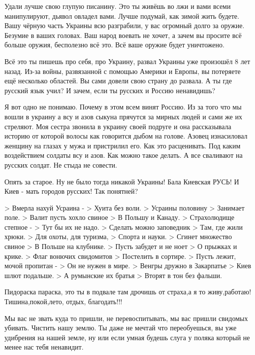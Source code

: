Удали лучше свою глупую писанину. Это ты живёшь во лжи и вами всеми
манипулируют, дьявол овладел вами. Лучше подумай, как зимой жить будете. Вашу
чёрную часть Украины всю разграбили, у вас огромный долго за оружие. Безумие в
ваших головах. Ваш народ воевать не хочет, а зачем вы просите всё больше
оружия, бесполезно всё это. Всё ваше оружие будет уничтожено.

Всё это ты пишешь про себя, про Украину, развал Украины уже произошёл 8 лет
назад. Из-за войны, развязанной с помощью Америки и Европы, вы потеряете ещё
несколько областей. Вы сами довели свою страну до развала. А ты где русский
язык учил? И зачем, если ты русских и Россию ненавидишь?

Я вот одно не понимаю. Почему в этом всем винят Россию. Из за того что мы вошли
в украину а всу и азов сыкуна прячутся за мирных людей и сами же их стреляют.
Моя сестра звонила в украину своей подруге и она рассказывала историю от
которой волосы как говорится дыбом на голове. Азовец изнасиловал женщину на
глазах у мужа и пристрилил его. Как это расценивать. Под каким воздействием
солдаты всу и азов. Как можно такое делать. А все сваливают на русских солдат.
Не стыда не совести.

Опять за старое.
Ну не было тогда никакой Украины!
Бала Киевская РУСЬ! И Киев - мать городов русских!
Так понятней?

> Вмерла нахуй Усраина -
> Хуита без воли.
> Усраины половину
> Занимает поле.
> Валит пусть хохло свиное
> В Польшу и Канаду.
> Страхолюдище степное -
> Тут бы их не надо.
> Сделать можно заповедник
> Там, где жили хрюки.
> Для охоты, для туризма,
> Спорта и науки.
> Сгинет множество свиное
> В Польше на клубнике.
> Пусть забудет и не ноет
> О прыжках и крике.
> Флаг вонючих свидомитов
> Постелить в сортире.
> Пусть лежит, мочой пропитан -
> Он не нужен в мире.
> Венгры дружно в Закарпатье
> Киев шлют подальше.
> А румынские их братья
> Вторят в тон без фальши.

Пидораска параска, это ты в подвале там дрочишь от страха,а я то живу,работаю!
Тишина,покой,лето, отдых, благодать!!!

Мы вас не звать куда то пришли, не перевоспитывать, мы вас пришли свидомых
убивать. Чистить нашу землю. Ты даже не мечтай что переобуешься, вы уже
удибрения на нашей земле, ну или если умная будешь слуга у поляка который не
менее нас тебя ненавидит.

